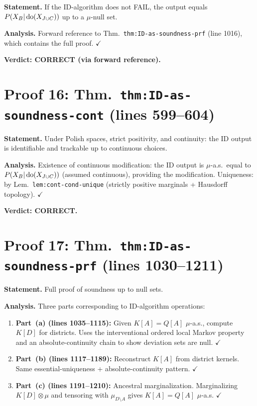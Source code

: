 \documentclass{article}
\begin{document}
\textbf{Statement.} If the ID-algorithm does not FAIL, the output equals
$P(X_B|\operatorname{do}(X_{J\cup C}))$ up to a $\mu$-null set.

\textbf{Analysis.}
Forward reference to Thm.\ \texttt{thm:ID-as-soundness-prf} (line 1016),
which contains the full proof.  $\checkmark$

\textbf{Verdict: CORRECT (via forward reference).}

\section{Proof 16: Thm.\ \texttt{thm:ID-as-soundness-cont} (lines 599--604)}

\textbf{Statement.} Under Polish spaces, strict positivity, and continuity:
the ID output is identifiable and trackable up to continuous choices.

\textbf{Analysis.}
Existence of continuous modification: the ID output is $\mu$-a.s.\ equal to
$P(X_B|\operatorname{do}(X_{J\cup C}))$ (assumed continuous), providing the modification.
Uniqueness: by Lem.\ \texttt{lem:cont-cond-unique} (strictly positive marginals
+ Hausdorff topology).  $\checkmark$

\textbf{Verdict: CORRECT.}

\section{Proof 17: Thm.\ \texttt{thm:ID-as-soundness-prf} (lines 1030--1211)}

\textbf{Statement.} Full proof of soundness up to null sets.

\textbf{Analysis.}
Three parts corresponding to ID-algorithm operations:
\begin{enumerate}[leftmargin=*]
  \item \textbf{Part~(a) (lines 1035--1115):} Given $K[A]=Q[A]$ $\mu$-a.s.,
    compute $K[D]$ for districts.  Uses the interventional ordered local Markov
    property and an absolute-continuity chain to show deviation sets are null.
    $\checkmark$
  \item \textbf{Part~(b) (lines 1117--1189):} Reconstruct $K[A]$ from district
    kernels.  Same essential-uniqueness + absolute-continuity pattern.  $\checkmark$
  \item \textbf{Part~(c) (lines 1191--1210):} Ancestral marginalization.
    Marginalizing $K[D]\otimes\mu$ and tensoring with $\mu_{D\setminus A}$ gives
    $K[A]=Q[A]$ $\mu$-a.s.  $\checkmark$
\end{enumerate}
\end{document}
